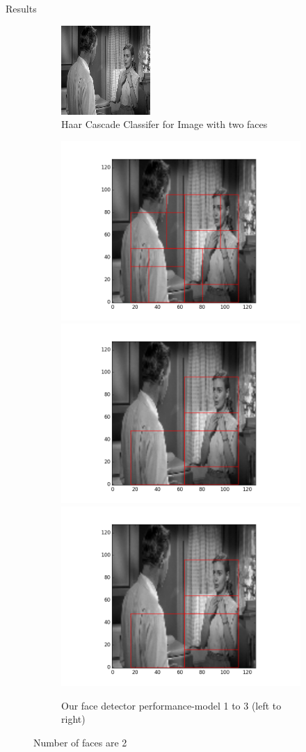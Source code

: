 \documentclass{beamer}
\begin{document}
\begin{frame}{Results}
\begin{figure}[h!]
  \begin{subfigure}{\linewidth}
  \centering
  \includegraphics[width=.3\linewidth]{twomodhaar.png}\hfill
  \caption{Haar Cascade Classifer for Image with two faces}
  \end{subfigure}\par\medskip
  \begin{subfigure}{\linewidth}
  \includegraphics[width=.3\linewidth]{twomod83.png}\hfill
  \includegraphics[width=.3\linewidth]{twomod91.png}\hfill
  \includegraphics[width=.3\linewidth]{twomod94.png}
  \caption{Our face detector performance-model 1 to 3 (left to right)}
  \end{subfigure}\par\medskip
  \caption{Number of faces are 2}
  \end{figure}
\end{frame}
\end{document}
